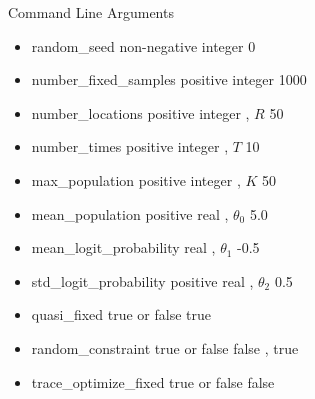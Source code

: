 \documentclass{beamer}
\begin{document}
\begin{frame}{Command Line Arguments}
\fontsize{10}{11}\selectfont
\begin{itemize}

\item
random\_seed
\hspace{4em} non-negative integer
\hspace{0em} 0
\pause

\item
number\_fixed\_samples
\hspace{0.2em} positive integer
\hspace{2.1em} 1000
\pause

\item
number\_locations
\hspace{2.0em} positive integer , $R$
\hspace{0.6em} 50
\pause

\item
number\_times
\hspace{3.5em} positive integer , $T$
\hspace{0.5em} 10
\pause

\item
max\_population
\hspace{2.7em} positive integer , $K$
\hspace{0.5em} 50
\pause

\item
mean\_population
\hspace{2.2em} positive real , $\theta_0$
\hspace{1.8em} 5.0
\pause

\item
mean\_logit\_probability
\hspace{0em} real , $\theta_1$
\hspace{5.1em} -0.5
\pause

\item
std\_logit\_probability
\hspace{1em} positive real , $\theta_2$
\hspace{1.9em} 0.5
\pause

\item
quasi\_fixed
\hspace{4.8em} true or false
\hspace{3.8em} true
\pause

\item
random\_constraint
\hspace{1.6em} true or false
\hspace{3.8em} false , true
\pause

\item
trace\_optimize\_fixed
\hspace{1em} true or false
\hspace{3.8em} false
\pause

\end{itemize}
\end{frame}
\end{document}
